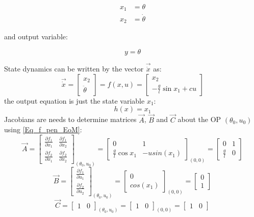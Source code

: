 \begin{align*}
	x_1 &= \theta \\
	x_2 &= \dot{\theta}
\end{align*}

and output variable:

\begin{equation*}
	y = \theta
\end{equation*}

State dynamics can be written by the vector $\vec{\dot{x}}$ as:
\begin{equation} \label{Eq_f_pen_EoM}
	\vec{\dot{x}} = \begin{bmatrix}
		x_2 \\ \ddot{\theta}
	\end{bmatrix} = f(x, u) = \begin{bmatrix}
		x_2 \\ -\frac{g}{l}\sin{x_1} + c u
	\end{bmatrix}
\end{equation}
the output equation is just the state variable $x_1$:
\begin{equation}
	h(x) = x_1
\end{equation}
Jacobians are needs to determine matrices $\vec{A}$, $\vec{B}$ and $\vec{C}$ about the OP $(\theta_0,u_0)$ using \eqref{Eq_f_pen_EoM}:
\begin{equation*}
		\vec{A} = \begin{bmatrix}
			\frac{\partial f_1}{\partial x_1} & \frac{\partial f_1}{\partial x_2} \\
			\frac{\partial f_2}{\partial x_1} & \frac{\partial f_2}{\partial x_2}
		\end{bmatrix}_{(\theta_0,u_0)} = \begin{bmatrix}
			0 & 1 \\
			\frac{g}{l} \cos{x_1} & - u sin(x_1)
		\end{bmatrix}_{(0,0)}  = \begin{bmatrix}
			0 &1 \\ \frac{g}{l} & 0
			\end{bmatrix}
\end{equation*}
\begin{equation*}
\vec{B} = \begin{bmatrix}
\frac{\partial f_1}{\partial u_1} \\
\frac{\partial f_2}{\partial u_2}
\end{bmatrix}_{(\theta_0,u_0)} = \begin{bmatrix}
0 \\ cos(x_1)
\end{bmatrix}_{(0,0)}  = \begin{bmatrix}
0\\ 1
\end{bmatrix}
\end{equation*}
\begin{equation*}
\vec{C} = \begin{bmatrix}
1 & 0
\end{bmatrix}_{(\theta_0,u_0)} = \begin{bmatrix}
1 & 0
\end{bmatrix}_{(0,0)}  = \begin{bmatrix}
1 & 0
\end{bmatrix}
\end{equation*}

